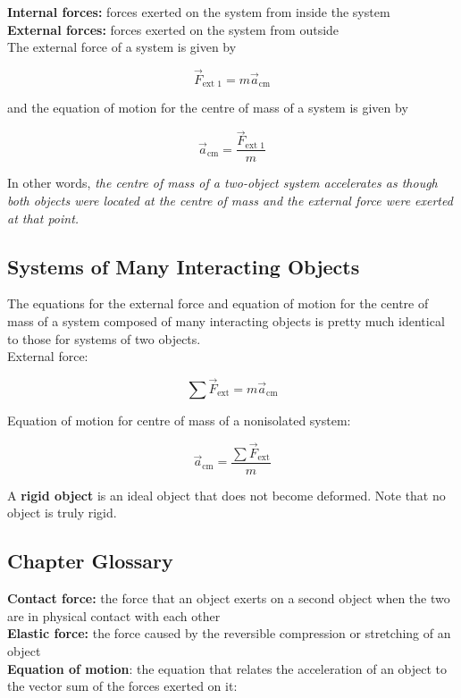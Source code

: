        \textbf{Internal forces:} forces exerted on the system from inside the system \\
        \textbf{External forces:} forces exerted on the system from outside \\

        The external force of a system is given by

        \[
            \vec{F}_{\text{ext 1}} = m\vec{a}_{\text{cm}}
        \]

        and the equation of motion for the centre of mass of a system is given by

        \[
            \vec{a}_{\text{cm}} = \frac{\vec{F}_{\text{ext 1}}}{m}
        \]

        In other words, \textit{the centre of mass of a two-object system accelerates as though both objects were located at the centre of mass and the external force were exerted at that point.}



    \subsection{Systems of Many Interacting Objects}

        The equations for the external force and equation of motion for the centre of mass of a system composed of many interacting objects is pretty much identical to those for systems of two objects. \\

        External force:

        \[
            \sum \vec{F}_{\text{ext}} = m\vec{a}_{\text{cm}}
        \]

        Equation of motion for centre of mass of a nonisolated system:

        \[
            \vec{a}_{\text{cm}} = \frac{\sum\vec{F}_{\text{ext}}}{m}
        \]

        A \textbf{rigid object} is an ideal object that does not become deformed. Note that no object is truly rigid.


    \subsection{Chapter Glossary}

        \textbf{Contact force:} the force that an object exerts on a second object when the two are in physical contact with each other \\
        \textbf{Elastic force:} the force caused by the reversible compression or stretching of an object \\
        \textbf{Equation of motion}: the equation that relates the acceleration of an object to the vector sum of the forces exerted on it:


